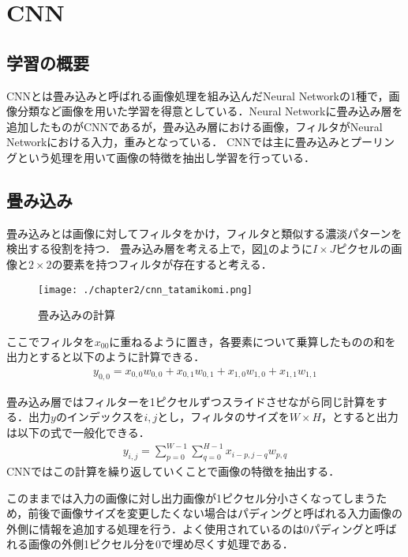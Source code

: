 \section{CNN}
\subsection{学習の概要}
CNNとは畳み込みと呼ばれる画像処理を組み込んだNeural Networkの1種で，画像分類など画像を用いた学習を得意としている．Neural Networkに畳み込み層を追加したものがCNNであるが，畳み込み層における画像，フィルタがNeural Networkにおける入力，重みとなっている．
CNNでは主に畳み込みとプーリングという処理を用いて画像の特徴を抽出し学習を行っている．


\subsection{畳み込み}
畳み込みとは画像に対してフィルタをかけ，フィルタと類似する濃淡パターンを検出する役割を持つ．
畳み込み層を考える上で，図\ref{fig_conv}のように$I \times J$ピクセルの画像と$2 \times 2$の要素を持つフィルタが存在すると考える．
\begin{figure}[htbp]
  \begin{center}
    \texttt{[image: ./chapter2/cnn\_tatamikomi.png]}
    \caption{畳み込みの計算}
    \label{fig_conv}
  \end{center}
\end{figure}

ここでフィルタを$x_{00}$に重ねるように置き，各要素について乗算したものの和を出力とすると以下のように計算できる．
\begin{align}
  y_{0,0} = x_{0,0}w_{0,0} + x_{0,1}w_{0,1} + x_{1,0}w_{1,0} + x_{1,1}w_{1,1}
  \label{fig_NN1}
\end{align}

畳み込み層ではフィルターを1ピクセルずつスライドさせながら同じ計算をする．出力$y$のインデックスを$i,j$とし，フィルタのサイズを$W\times H$，とすると出力は以下の式で一般化できる．
\begin{align}
  y_{i,j} = \sum^{W-1}_{p=0} \sum^{H-1}_{q=0} x_{i-p,j-q}w_{p,q}
\end{align}
CNNではこの計算を繰り返していくことで画像の特徴を抽出する．

このままでは入力の画像に対し出力画像が1ピクセル分小さくなってしまうため，前後で画像サイズを変更したくない場合はパディングと呼ばれる入力画像の外側に情報を追加する処理を行う．よく使用されているのは0パディングと呼ばれる画像の外側1ピクセル分を0で埋め尽くす処理である．

